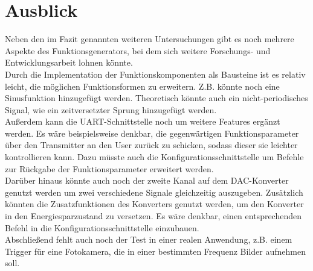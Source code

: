 \chapter{Ausblick}
Neben den im Fazit genannten weiteren Untersuchungen gibt es noch mehrere Aspekte des Funktionsgenerators, bei dem sich weitere Forschungs- und Entwicklungsarbeit lohnen könnte.\\
Durch die Implementation der Funktionskomponenten als Bausteine ist es relativ leicht, die möglichen Funktionsformen zu erweitern.
Z.B. könnte noch eine Sinusfunktion hinzugefügt werden.
Theoretisch könnte auch ein nicht-periodisches Signal, wie ein zeitversetzter Sprung hinzugefügt werden.\\
Außerdem kann die UART-Schnittstelle noch um weitere Features ergänzt werden.
Es wäre beispielsweise denkbar, die gegenwärtigen Funktionsparameter über den Transmitter an den User zurück zu schicken, sodass dieser sie leichter kontrollieren kann.
Dazu müsste auch die Konfigurationsschnittstelle um Befehle zur Rückgabe der Funktionsparameter erweitert werden. \\
Darüber hinaus könnte auch noch der zweite Kanal auf dem DAC-Konverter genutzt werden um zwei verschiedene Signale gleichzeitig auszugeben.
Zusätzlich könnten die Zusatzfunktionen des Konverters genutzt werden, um den Konverter in den Energiesparzustand zu versetzen.
Es wäre denkbar, einen entsprechenden Befehl in die Konfigurationsschnittstelle einzubauen. \\
Abschließend fehlt auch noch der Test in einer realen Anwendung, z.B. einem Trigger für eine Fotokamera, die in einer bestimmten Frequenz Bilder aufnehmen soll.